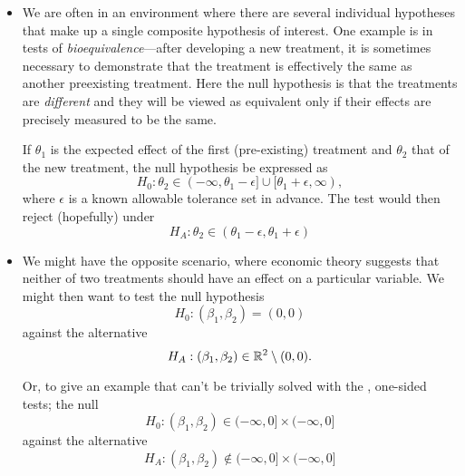 \begin{itemize}[leftmargin=0pt]

\item We are often in an environment where there are several
  individual hypotheses that make up a single composite hypothesis of
  interest. One example is in tests of \emph{bioequivalence}---after
  developing a new treatment, it is sometimes necessary to demonstrate
  that the treatment is effectively the same as another preexisting
  treatment.  Here the null hypothesis is that the treatments are
  \emph{different} and they will be viewed as equivalent only if their
  effects are precisely measured to be the same.

  If $\theta_1$ is the expected effect of the first (pre-existing)
  treatment and $\theta_2$ that of the new treatment, the null
  hypothesis be expressed as
  \begin{equation*}
    H_0: \theta_2 \in
    (-\infty, \theta_1 - \epsilon] \cup [\theta_1 + \epsilon, \infty),
  \end{equation*}
  where $\epsilon$ is a known allowable tolerance set in advance.  The
  test would then reject (hopefully) under
  \begin{equation*}
    H_A: \theta_2 \in (\theta_1 - \epsilon, \theta_1 + \epsilon)
  \end{equation*}

\item We might have the opposite scenario, where economic theory
  suggests that neither of two treatments should have an effect on a
  particular variable.  We might then want to test the null hypothesis
  \begin{equation*}
    H_0: (\beta_1, \beta_2) = (0,0)
  \end{equation*}
  against the alternative
  \begin{equation*}
    H_A: (\beta_1, \beta_2) \in \mathbb{R}^2 \setminus (0,0).
  \end{equation*}
  
  Or, to give an example that can't be trivially solved with the
  \ftest, one-sided tests; the null
  \begin{equation*}
    H_0: (\beta_1, \beta_2) \in (-\infty, 0] \times (-\infty, 0]
  \end{equation*}
  against the alternative
  \begin{equation*}
    H_A: (\beta_1, \beta_2) \notin (-\infty, 0] \times (-\infty, 0]
  \end{equation*}


\end{itemize}
